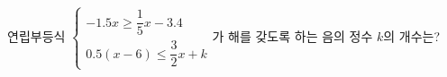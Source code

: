 연립부등식 $\begin{cases} -1.5x\ge \dfrac{1}{5}x-3.4 \\ 0.5(x-6)\le \dfrac{3}{2}x+k \end{cases}$가 해를 갖도록 하는 음의 정수 $k$의 개수는?
